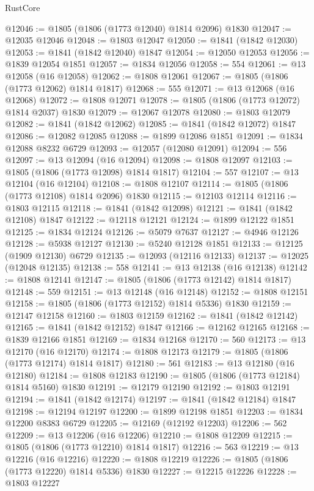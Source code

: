 \begin{lexlean}{RustCore}
\begin{coremodule}
@12046 := @1805 (@1806 (@1773 @12040) @1814 @2096) @1830
@12047 := @12035 @12046
@12048 := @1803 @12047
@12050 := @1841 (@1842 @12030)
@12053 := @1841 (@1842 @12040) @1847
@12054 := @12050 @12053
@12056 := @1839 @12054 @1851
@12057 := @1834 @12056
@12058 := 554
@12061 := @13 @12058 (@16 @12058)
@12062 := @1808 @12061
@12067 := @1805 (@1806 (@1773 @12062) @1814 @1817)
@12068 := 555
@12071 := @13 @12068 (@16 @12068)
@12072 := @1808 @12071
@12078 := @1805 (@1806 (@1773 @12072) @1814 @2037) @1830
@12079 := @12067 @12078
@12080 := @1803 @12079
@12082 := @1841 (@1842 @12062)
@12085 := @1841 (@1842 @12072) @1847
@12086 := @12082 @12085
@12088 := @1899 @12086 @1851
@12091 := @1834 @12088 @8232 @6729
@12093 := @12057 (@12080 @12091)
@12094 := 556
@12097 := @13 @12094 (@16 @12094)
@12098 := @1808 @12097
@12103 := @1805 (@1806 (@1773 @12098) @1814 @1817)
@12104 := 557
@12107 := @13 @12104 (@16 @12104)
@12108 := @1808 @12107
@12114 := @1805 (@1806 (@1773 @12108) @1814 @2096) @1830
@12115 := @12103 @12114
@12116 := @1803 @12115
@12118 := @1841 (@1842 @12098)
@12121 := @1841 (@1842 @12108) @1847
@12122 := @12118 @12121
@12124 := @1899 @12122 @1851
@12125 := @1834 @12124
@12126 := @5079 @7637
@12127 := @4946 @12126
@12128 := @5938 @12127
@12130 := @5240 @12128 @1851
@12133 := @12125 (@1909 @12130) @6729
@12135 := @12093 (@12116 @12133)
@12137 := @12025 (@12048 @12135)
@12138 := 558
@12141 := @13 @12138 (@16 @12138)
@12142 := @1808 @12141
@12147 := @1805 (@1806 (@1773 @12142) @1814 @1817)
@12148 := 559
@12151 := @13 @12148 (@16 @12148)
@12152 := @1808 @12151
@12158 := @1805 (@1806 (@1773 @12152) @1814 @5336) @1830
@12159 := @12147 @12158
@12160 := @1803 @12159
@12162 := @1841 (@1842 @12142)
@12165 := @1841 (@1842 @12152) @1847
@12166 := @12162 @12165
@12168 := @1839 @12166 @1851
@12169 := @1834 @12168
@12170 := 560
@12173 := @13 @12170 (@16 @12170)
@12174 := @1808 @12173
@12179 := @1805 (@1806 (@1773 @12174) @1814 @1817)
@12180 := 561
@12183 := @13 @12180 (@16 @12180)
@12184 := @1808 @12183
@12190 := @1805 (@1806 (@1773 @12184) @1814 @5160) @1830
@12191 := @12179 @12190
@12192 := @1803 @12191
@12194 := @1841 (@1842 @12174)
@12197 := @1841 (@1842 @12184) @1847
@12198 := @12194 @12197
@12200 := @1899 @12198 @1851
@12203 := @1834 @12200 @8383 @6729
@12205 := @12169 (@12192 @12203)
@12206 := 562
@12209 := @13 @12206 (@16 @12206)
@12210 := @1808 @12209
@12215 := @1805 (@1806 (@1773 @12210) @1814 @1817)
@12216 := 563
@12219 := @13 @12216 (@16 @12216)
@12220 := @1808 @12219
@12226 := @1805 (@1806 (@1773 @12220) @1814 @5336) @1830
@12227 := @12215 @12226
@12228 := @1803 @12227

\end{coremodule}
\end{lexlean}
